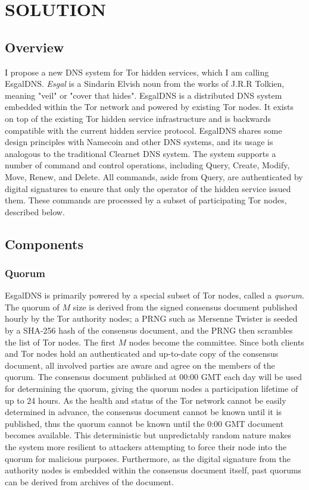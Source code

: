 

\chapter{\uppercase{Solution}}

\section{Overview}

I propose a new DNS system for Tor hidden services, which I am calling EsgalDNS. \textit{Esgal} is a Sindarin Elvish noun from the works of J.R.R Tolkien, meaning "veil" or "cover that hides".\cite{SindarinDict} EsgalDNS is a distributed DNS system embedded within the Tor network and powered by existing Tor nodes. It exists on top of the existing Tor hidden service infrastructure and is backwards compatible with the current hidden service protocol. EsgalDNS shares some design principles with Namecoin and other DNS systems, and its usage is analogous to the traditional Clearnet DNS system. The system supports a number of command and control operations, including Query, Create, Modify, Move, Renew, and Delete. All commands, aside from Query, are authenticated by digital signatures to ensure that only the operator of the hidden service issued them. These commands are processed by a subset of participating Tor nodes, described below.

\section{Components}

\subsection{Quorum}

EsgalDNS is primarily powered by a special subset of Tor nodes, called a \textit{quorum}. The quorum of $ M $ size is derived from the signed consensus document published hourly by the Tor authority nodes; a PRNG such as Mersenne Twister is seeded by a SHA-256 hash of the consensus document, and the PRNG then scrambles the list of Tor nodes. The first $ M $ nodes become the committee. Since both clients and Tor nodes hold an authenticated and up-to-date copy of the consensus document, all involved parties are aware and agree on the members of the quorum. The consensus document published at 00:00 GMT each day will be used for determining the quorum, giving the quorum nodes a participation lifetime of up to 24 hours. As the health and status of the Tor network cannot be easily determined in advance, the consensus document cannot be known until it is published, thus the quorum cannot be known until the 0:00 GMT document becomes available. This deterministic but unpredictably random nature makes the system more resilient to attackers attempting to force their node into the quorum for malicious purposes. Furthermore, as the digital signature from the authority nodes is embedded within the consensus document itself, past quorums can be derived from archives of the document.

